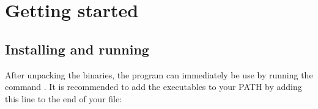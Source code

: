 \section{Getting started}

\subsection{Installing and running \mumax}

After unpacking the \mumax binaries, the program can immediately be use by running the command . It is recommended to add the \mumax executables to your PATH by adding this line to the end of your  file:
